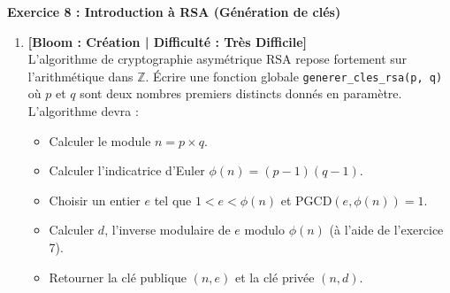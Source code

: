 \noindent\textbf{Exercice 8 : Introduction à RSA (Génération de clés)} 
\begin{enumerate}
    \item \textbf{[Bloom : Création | Difficulté : Très Difficile]} \\
    L'algorithme de cryptographie asymétrique RSA repose fortement sur l'arithmétique dans $\mathbb{Z}$. Écrire une fonction globale \texttt{generer\_cles\_rsa(p, q)} où $p$ et $q$ sont deux nombres premiers distincts donnés en paramètre.
    L'algorithme devra :
    \begin{itemize}
        \item Calculer le module $n = p \times q$.
        \item Calculer l'indicatrice d'Euler $\phi(n) = (p-1)(q-1)$.
        \item Choisir un entier $e$ tel que $1 < e < \phi(n)$ et $\text{PGCD}(e, \phi(n)) = 1$.
        \item Calculer $d$, l'inverse modulaire de $e$ modulo $\phi(n)$ (à l'aide de l'exercice 7).
        \item Retourner la clé publique $(n, e)$ et la clé privée $(n, d)$.
    \end{itemize}
\end{enumerate}